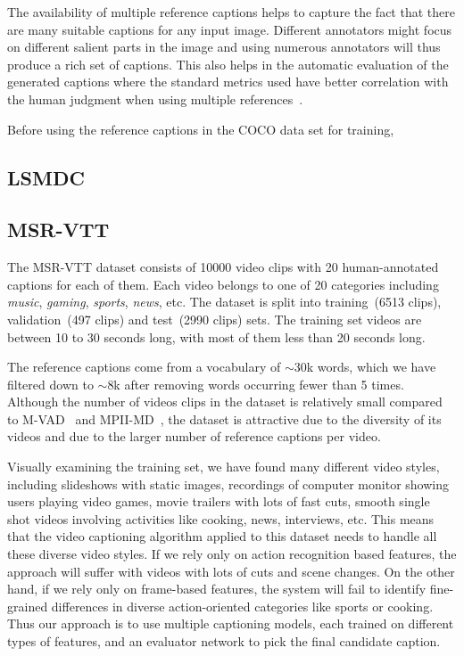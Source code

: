 The availability of multiple reference captions helps to capture the
fact that there are many suitable captions for any input image.
Different annotators might focus on different salient parts in the
image and using numerous annotators will thus produce a rich set of
captions.
This also helps in the automatic evaluation of the generated captions
where the standard metrics used have better correlation with the human
judgment when using multiple references~\cite{Vedantam_2015_CVPR}.

Before using the reference captions in the COCO data set for training,

\subsection{LSMDC}
\label{subsec:LsmdcData}
\subsection{MSR-VTT}
The MSR-VTT dataset consists of 10000 video clips with 20
human-annotated captions for each of them.
Each video belongs to one of 20 categories including \emph{music},
\emph{gaming}, \emph{sports}, \emph{news}, etc.
The dataset is split into training~(6513 clips), validation~(497
clips) and test~(2990 clips) sets. 
The training set videos are between 10 to 30 seconds long, with most
of them less than 20 seconds long.

The reference captions come from a vocabulary of $\sim$30k words,
which we have filtered down to $\sim$8k after removing words occurring
fewer than 5 times.
Although the number of videos clips in the dataset is relatively small
compared to M-VAD~\cite{rohrbach15cvpr} and
MPII-MD~\cite{AtorabiM-VAD2015}, the dataset is attractive due to the
diversity of its videos and due to the larger number of reference
captions per video.

Visually examining the training set, we have found many different
video styles, including slideshows with static images, recordings of
computer monitor showing users playing video games, movie trailers
with lots of fast cuts, smooth single shot videos involving
activities like cooking, news, interviews, etc.
This means that the video captioning algorithm applied to this dataset
needs to handle all these diverse video styles.
If we rely only on action recognition based features, the approach
will suffer with videos with lots of cuts and scene changes.
On the other hand, if we rely only on frame-based features, the system
will fail to identify fine-grained differences in diverse
action-oriented categories like sports or cooking.
Thus our approach is to use multiple captioning models, each trained
on different types of features, and an evaluator network to pick the
final candidate caption.
